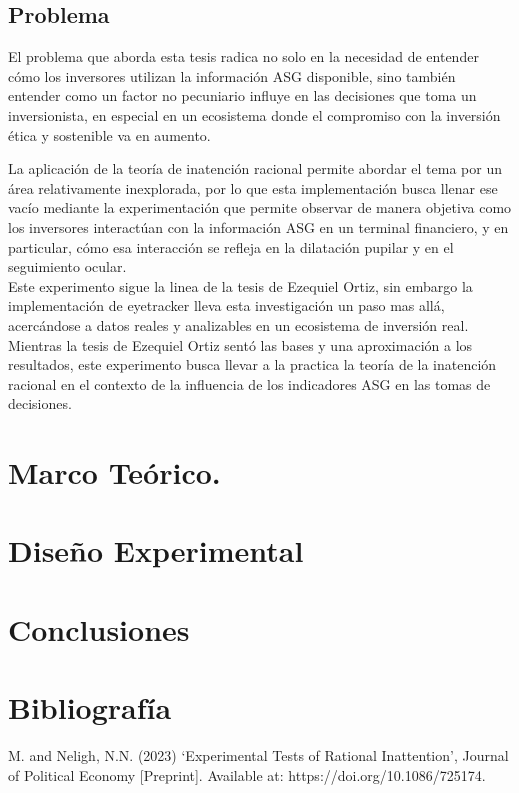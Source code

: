 \documentclass[11pt,letterpaper]{article}
\begin{document}
\subsection{Problema}
El problema que aborda esta tesis radica no solo en la necesidad de entender cómo los inversores utilizan la información ASG disponible, sino también entender como un factor no pecuniario influye en las decisiones que toma un inversionista, en especial en un ecosistema donde el compromiso con la inversión ética y sostenible va en aumento. 

La aplicación de la teoría de inatención racional permite abordar el tema por un área relativamente inexplorada, por lo que esta implementación busca llenar ese vacío mediante la experimentación que permite observar de manera objetiva como los inversores interactúan con la información ASG en un terminal financiero, y en particular, cómo esa interacción se refleja en la dilatación pupilar y en el seguimiento ocular.\\

Este experimento sigue la linea de la tesis de Ezequiel Ortiz, sin embargo la implementación de eyetracker  lleva esta investigación un paso mas allá, acercándose a datos reales y analizables en un ecosistema de inversión real. Mientras la tesis de Ezequiel Ortiz sentó las bases y una aproximación a los resultados, este experimento busca llevar a la practica la teoría de la inatención racional en el contexto de la influencia de los indicadores ASG en las tomas de decisiones.


\section{Marco Teórico.}




\section{Diseño Experimental}



\section{Conclusiones}

\section{Bibliografía}


\noindent M. and Neligh, N.N. (2023) ‘Experimental Tests of Rational Inattention’, Journal of Political Economy [Preprint]. Available at: https://doi.org/10.1086/725174.\\
\end{document}
